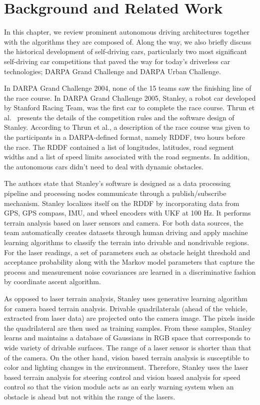 \chapter{Background and Related Work}
\label{chp:b2}

In this chapter, we review prominent autonomous driving architectures together
with the algorithms they are composed of. Along the way, we also briefly
discuss the historical development of self-driving cars, particularly two most
significant self-driving car competitions that paved the way for today's
driverless car technologies; DARPA Grand Challenge and DARPA Urban Challenge.

In DARPA Grand Challenge 2004, none of the 15 teams saw the finishing line of
the race course. In DARPA Grand Challenge 2005, Stanley, a robot car developed
by Stanford Racing Team, was the first car to complete the race course. Thrun
et al.\ \cite{Thrun2006StanleyTR} presents the details of the competition rules
and the software design of Stanley. According to Thrun et al., a description of
the race course was given to the participants in a DARPA-defined format, namely
RDDF, two hours before the race. The RDDF contained a list of longitudes,
latitudes, road segment widths and a list of speed limits associated with the
road segments. In addition, the autonomous cars didn't need to deal with
dynamic obstacles.

The authors state that Stanley's software is designed as a data processing
pipeline and processing nodes communicate through a publish/subscribe
mechanism. Stanley localizes itself on the RDDF by incorporating data from GPS,
GPS compass, IMU, and wheel encoders with UKF at 100 Hz. It performs terrain
analysis based on laser sensors and camera. For both data sources, the team
automatically creates datasets through human driving and apply machine learning
algorithms to classify the terrain into drivable and nondrivable regions. For
the laser readings, a set of parameters such as obstacle height threshold and
acceptance probability along with the Markov model parameters that capture the
process and measurement noise covariances are learned in a discriminative
fashion by coordinate ascent algorithm.

As opposed to laser terrain analysis, Stanley uses generative learning
algorithm for camera based terrain analysis. Drivable quadrilaterals (ahead of
the vehicle, extracted from laser data) are projected onto the camera image.
The pixels inside the quadrilateral are then used as training samples. From
these samples, Stanley learns and maintains a database of Gaussians in RGB
space that corresponds to wide variety of drivable surfaces. The range of a
laser sensor is shorter than that of the camera. On the other hand, vision
based terrain analysis is susceptible to color and lighting changes in the
environment. Therefore, Stanley uses the laser based terrain analysis for
steering control and vision based analysis for speed control so that the vision
module acts as an early warning system when an obstacle is ahead but not within
the range of the lasers.

